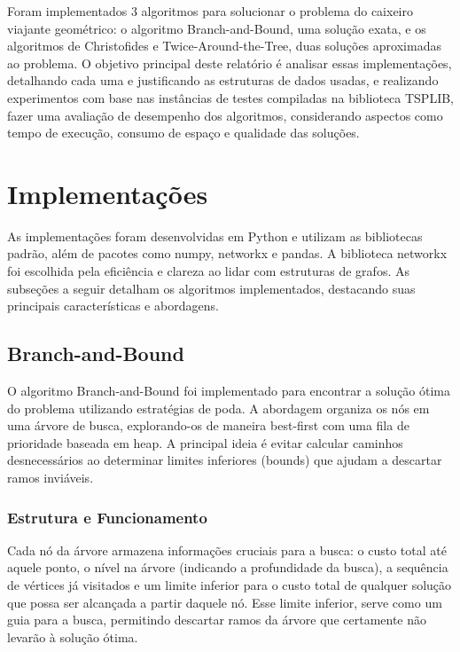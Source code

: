 \documentclass[12pt]{article}
\begin{document}
Foram implementados 3 algoritmos para solucionar o problema do caixeiro viajante geométrico: o algoritmo Branch-and-Bound, uma solução exata, e os algoritmos de Christofides e Twice-Around-the-Tree, duas soluções aproximadas ao problema. O objetivo principal deste relatório é analisar essas implementações, detalhando cada uma e justificando as estruturas de dados usadas, e realizando experimentos com base nas instâncias de testes compiladas na biblioteca TSPLIB, fazer uma avaliação de desempenho dos algoritmos, considerando aspectos como tempo de execução, consumo de espaço e qualidade das soluções.


\section{Implementações}

As implementações foram desenvolvidas em Python e utilizam as bibliotecas padrão, além de pacotes como numpy, networkx e pandas. A biblioteca networkx foi escolhida pela eficiência e clareza ao lidar com estruturas de grafos. As subseções a seguir detalham os algoritmos implementados, destacando suas principais características e abordagens.

\subsection{Branch-and-Bound}

O algoritmo Branch-and-Bound foi implementado para encontrar a solução ótima do problema utilizando estratégias de poda. A abordagem organiza os nós em uma árvore de busca, explorando-os de maneira best-first com uma fila de prioridade baseada em heap. A principal ideia é evitar calcular caminhos desnecessários ao determinar limites inferiores (bounds) que ajudam a descartar ramos inviáveis.

\subsubsection{Estrutura e Funcionamento}

Cada nó da árvore armazena informações cruciais para a busca: o custo total até aquele ponto, o nível na árvore (indicando a profundidade da busca), a sequência de vértices já visitados e um limite inferior para o custo total de qualquer solução que possa ser alcançada a partir daquele nó. Esse limite inferior, serve como um guia para a busca, permitindo descartar ramos da árvore que certamente não levarão à solução ótima.
\end{document}
